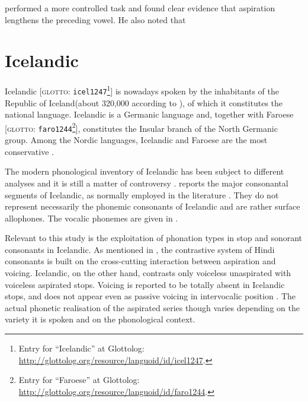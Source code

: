 
\citet{durvasula2012} performed a more controlled task and found clear evidence that aspiration lengthens the preceding vowel.
He also noted that %

\section{Icelandic}

Icelandic [\textsc{glotto}: \texttt{icel1247}\footnote{Entry for ``Icelandic'' at Glottolog: \url{http://glottolog.org/resource/languoid/id/icel1247}.}] is nowadays spoken by the inhabitants of the Republic of Iceland(about 320,000 according to \citealt{arnason2011}), of which it constitutes the national language.
Icelandic is a Germanic language and, together with Faroese [\textsc{glotto}: \texttt{faro1244}\footnote{Entry for ``Faroese'' at Glottolog: \url{http://glottolog.org/resource/languoid/id/faro1244}.}], constitutes the Insular branch of the North Germanic group.
Among the Nordic languages, Icelandic and Faroese are the most conservative \citep{harbert2006,konig2013}.

The modern phonological inventory of Icelandic has been subject to different analyses and it is still a matter of controversy \citep{thraisson1978,jessen1998,arnason2011}.
 reports the major consonantal segments of Icelandic, as normally employed in the literature \citep[98]{arnason2011}.
They do not represent necessarily the phonemic consonants of Icelandic and are rather surface allophones.
The vocalic phonemes are given in  \citep[60]{arnason2011}.


Relevant to this study is the exploitation of phonation types in stop and sonorant consonants in Icelandic.
As mentioned in , the contrastive system of Hindi consonants is built on the cross-cutting interaction between aspiration and voicing.
Icelandic, on the other hand, contrasts only voiceless unaspirated with voiceless aspirated stops.
Voicing is reported to be totally absent in Icelandic stops, and does not appear even as passive voicing in intervocalic position \citep{arnason2011}.
The actual phonetic realisation of the aspirated series though varies depending on the variety it is spoken and on the phonological context.












